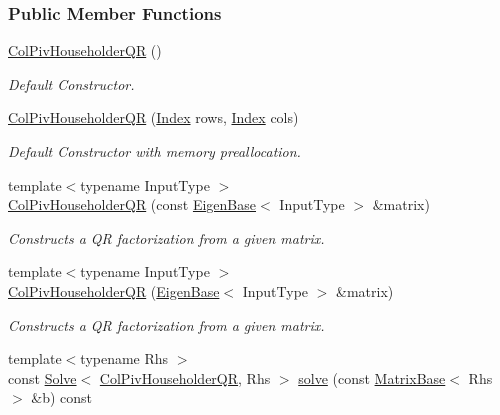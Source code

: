 \subsubsection*{Public Member Functions}
\begin{DoxyCompactItemize}
\item 
\hyperlink{group___q_r___module_a9d8a92c2a2f0debe5454812372237ed4}{Col\+Piv\+Householder\+QR} ()
\begin{DoxyCompactList}\small\item\em Default Constructor. \end{DoxyCompactList}\item 
\hyperlink{group___q_r___module_a5965d4fdebc04b2df71d67ff0b2d0c2c}{Col\+Piv\+Householder\+QR} (\hyperlink{namespace_eigen_a62e77e0933482dafde8fe197d9a2cfde}{Index} rows, \hyperlink{namespace_eigen_a62e77e0933482dafde8fe197d9a2cfde}{Index} cols)
\begin{DoxyCompactList}\small\item\em Default Constructor with memory preallocation. \end{DoxyCompactList}\item 
{\footnotesize template$<$typename Input\+Type $>$ }\\\hyperlink{group___q_r___module_a1aa6a5b95380df0ceb224cb833316d4f}{Col\+Piv\+Householder\+QR} (const \hyperlink{group___core___module_struct_eigen_1_1_eigen_base}{Eigen\+Base}$<$ Input\+Type $>$ \&matrix)
\begin{DoxyCompactList}\small\item\em Constructs a QR factorization from a given matrix. \end{DoxyCompactList}\item 
{\footnotesize template$<$typename Input\+Type $>$ }\\\hyperlink{group___q_r___module_a65782010a93a4c9ef4a9191ac8fe30bc}{Col\+Piv\+Householder\+QR} (\hyperlink{group___core___module_struct_eigen_1_1_eigen_base}{Eigen\+Base}$<$ Input\+Type $>$ \&matrix)
\begin{DoxyCompactList}\small\item\em Constructs a QR factorization from a given matrix. \end{DoxyCompactList}\item 
{\footnotesize template$<$typename Rhs $>$ }\\const \hyperlink{group___core___module_class_eigen_1_1_solve}{Solve}$<$ \hyperlink{group___q_r___module_class_eigen_1_1_col_piv_householder_q_r}{Col\+Piv\+Householder\+QR}, Rhs $>$ \hyperlink{group___q_r___module_aaa9c4af89930ab3bb7612ed9ae33d3f5}{solve} (const \hyperlink{group___core___module_class_eigen_1_1_matrix_base}{Matrix\+Base}$<$ Rhs $>$ \&b) const

\end{DoxyCompactItemize}

